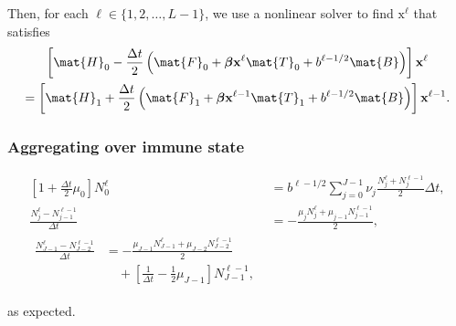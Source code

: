 \documentclass{jpmarticle}
\renewcommand{\vec}[1]{\boldsymbol{\mathrm{#1}}}
\let\subequationsorig\subequations%
\let\endsubequationsorig\endsubequations%
\renewenvironment{subequations}{
  \subequationsorig
  \renewcommand{\theequation}{\theparentequation.\arabic{equation}}
}{
  \endsubequationsorig
}
\begin{document}
Then, for each $\ell \in \{1, 2, \ldots, L - 1\}$,
we use a nonlinear solver to find $\vec{x}^{\ell}$ that satisfies
\begin{multline}
  \left[
    \mat{H}_0
    - \frac{\Delta t}{2}
    \left(
      \mat{F}_0
      + \vec{\beta} \vec{x}^{\ell} \mat{T}_0
      + b^{\ell - 1 / 2} \mat{B}
    \right)
  \right] \vec{x}^{\ell}
  \\
  = \left[
    \mat{H}_1
    + \frac{\Delta t}{2}
    \left(
      \mat{F}_1
      + \vec{\beta} \vec{x}^{\ell - 1} \mat{T}_1
      + b^{\ell - 1 / 2} \mat{B}
    \right)
  \right] \vec{x}^{\ell - 1}.
\end{multline}


\subsubsection{Aggregating over immune state}

\begin{subequations}
  \begin{align}
    \left[1 + \frac{\Delta t}{2} \mu_0\right] N_0^{\ell}
    &= b^{\ell - 1 / 2}
    \sum_{j = 0}^{J - 1} \nu_j \frac{N_j^{\ell} + N_j^{\ell - 1}}{2} \Delta t,
    \\
    \frac{N_j^{\ell} - N_{j - 1}^{\ell - 1}}{\Delta t}
    &= - \frac{\mu_j N_j^{\ell} + \mu_{j - 1} N_{j - 1}^{\ell - 1}}{2},
    \\
    \begin{split}
      \frac{N_{J - 1}^{\ell} - N_{J - 2}^{\ell - 1}}{\Delta t}
      &= - \frac{\mu_{J - 1} N_{J - 1}^{\ell} + \mu_{J - 2} N_{J - 2}^{\ell - 1}}{2}
      \\ & \quad {}
      + \left[\frac{1}{\Delta t} - \frac{1}{2} \mu_{J - 1}\right]
      N_{J - 1}^{\ell - 1},
    \end{split}
  \end{align}
\end{subequations}
as expected.
\end{document}
